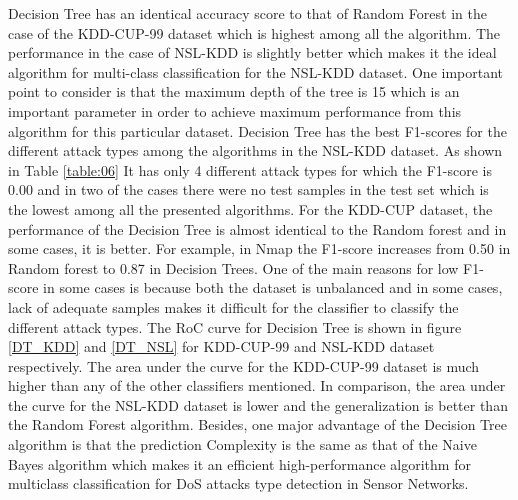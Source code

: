 \documentclass[conference]{IEEEtran}
\begin{document}
Decision Tree \cite{CART} has an identical accuracy score to that of Random Forest \cite{random_forest} in the case of the KDD-CUP-99 dataset which is highest among all the algorithm. The performance in the case of NSL-KDD is slightly better which makes it the ideal algorithm for multi-class classification for the NSL-KDD dataset. One important point to consider is that the maximum depth of the tree is 15 which is an important parameter in order to achieve maximum performance from this algorithm for this particular dataset. Decision Tree has the best F1-scores for the different attack types among the algorithms in the NSL-KDD dataset. As shown in Table \ref{table:06} It has only 4 different attack types for which the F1-score is 0.00 and in two of the cases there were no test samples in the test set which is the lowest among all the presented algorithms. For the KDD-CUP dataset, the performance of the Decision Tree is almost identical to the Random forest and in some cases, it is better. For example, in Nmap the F1-score increases from 0.50 in Random forest to 0.87 in Decision Trees. One of the main reasons for low F1-score in some cases is because both the dataset is unbalanced and in some cases, lack of adequate samples makes it difficult for the classifier to classify the different attack types. The RoC curve for Decision Tree is shown in figure \ref{DT_KDD} and \ref{DT_NSL} for KDD-CUP-99 and NSL-KDD dataset respectively. The area under the curve for the KDD-CUP-99 dataset is much higher than any of the other classifiers mentioned. In comparison, the area under the curve for the NSL-KDD dataset is lower and the generalization is better than the Random Forest algorithm. Besides, one major advantage of the Decision Tree algorithm is that the prediction Complexity is the same as that of the Naive Bayes algorithm which makes it an efficient high-performance algorithm for multiclass classification for DoS attacks type detection in Sensor Networks. 
\end{document}

